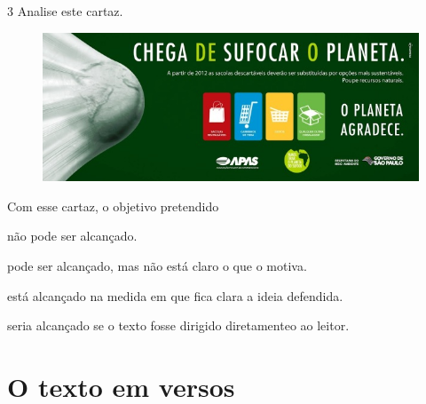 \num{3} Analise este cartaz.


\begin{figure}[htpb!]
\includegraphics[width=\textwidth]{./media/image14.jpeg}
\end{figure}


Com esse cartaz, o objetivo pretendido

\begin{escolha}[itemsep=-5pt]
\item não pode ser alcançado.

\item pode ser alcançado, mas não está claro o que o motiva.

\item está alcançado na medida em que fica clara a ideia defendida.

\item seria alcançado se o texto fosse dirigido diretamenteo ao leitor.
\end{escolha}

\chapter{O texto em versos}


